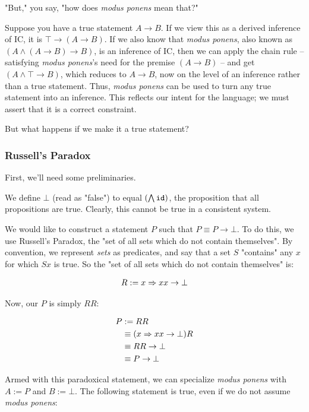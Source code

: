 \documentclass{article}
\begin{document}
  "But," you say, "how does \emph{modus ponens} mean that?"
  
  Suppose you have a true statement $A \to B$. If we view this as a derived inference of IC, it is $\top \to (A \to B)$. If we also know that \emph{modus ponens}, also known as $(A \wedge (A \to B) \to B)$, is an inference of IC, then we can apply the chain rule – satisfying \emph{modus ponens}'s need for the premise $(A \to B)$ – and get $(A \wedge \top \to B)$, which reduces to $A \to B$, now on the level of an inference rather than a true statement. Thus, \emph{modus ponens} can be used to turn any true statement into an inference. This reflects our intent for the language; we must assert that it is a correct constraint.
  
  But what happens if we make it a true statement?
  
  \subsubsection{Russell's Paradox}
  
  First, we'll need some preliminaries.
  
  We define $\bot$ (read as "false") to equal $(\bigwedge \operatorname{\texttt{id}})$, the proposition that all propositions are true. Clearly, this cannot be true in a consistent system.
  
  We would like to construct a statement $P$ such that $P \equiv P \to \bot$. To do this, we use Russell's Paradox, the "set of all sets which do not contain themselves". By convention, we represent \emph{sets} as predicates, and say that a set $S$ "contains" any $x$ for which $S x$ is true. So the "set of all sets which do not contain themselves" is:
  
  \begin{align*}
    R := x \Rightarrow x x \to \bot
  \end{align*}
  
  Now, our $P$ is simply $RR$:
  
  \begin{align*}
    P &:= RR\\
      &\equiv (x \Rightarrow x x \to \bot)R\\
      &\equiv RR \to \bot\\
      &\equiv P \to \bot\\
  \end{align*}
  
  Armed with this paradoxical statement, we can specialize \emph{modus ponens} with $A := P$ and $B := \bot$. The following statement is true, even if we do not assume \emph{modus ponens}:
  
\end{document}
